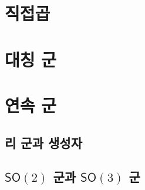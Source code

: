 \documentclass{book}
\theoremstyle{definition}
\begin{document}
	\section{직접곱}
	
	\section{대칭 군}
	
	\section{연속 군}
	
	\subsection{리 군과 생성자}
	
	\subsection{$\mathsf{SO}(2)$ 군과 $\mathsf{SO}(3)$ 군}
	

	
	
\end{document}
